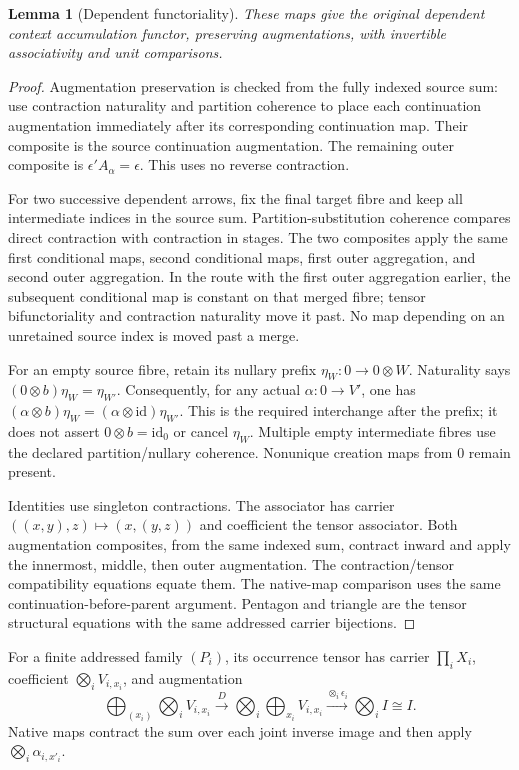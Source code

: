 \documentclass[11pt]{article}
\newtheorem{lemma}[theorem]{Lemma}
\newcommand{\id}{\mathrm{id}}
\begin{document}
\begin{lemma}[Dependent functoriality]
These maps give the original dependent context accumulation functor, preserving augmentations, with invertible associativity and unit comparisons.
\end{lemma}
\begin{proof}
Augmentation preservation is checked from the fully indexed source sum: use contraction naturality and partition coherence to place each continuation augmentation immediately after its corresponding continuation map. Their composite is the source continuation augmentation. The remaining outer composite is $\epsilon' A_\alpha=\epsilon$. This uses no reverse contraction.

For two successive dependent arrows, fix the final target fibre and keep all intermediate indices in the source sum. Partition-substitution coherence compares direct contraction with contraction in stages. The two composites apply the same first conditional maps, second conditional maps, first outer aggregation, and second outer aggregation. In the route with the first outer aggregation earlier, the subsequent conditional map is constant on that merged fibre; tensor bifunctoriality and contraction naturality move it past. No map depending on an unretained source index is moved past a merge.

For an empty source fibre, retain its nullary prefix $\eta_W:0\to0\otimes W$. Naturality says $(0\otimes b)\eta_W=\eta_{W'}$. Consequently, for any actual $\alpha:0\to V'$, one has $(\alpha\otimes b)\eta_W=(\alpha\otimes\id)\eta_{W'}$. This is the required interchange after the prefix; it does not assert $0\otimes b=\id_0$ or cancel $\eta_W$. Multiple empty intermediate fibres use the declared partition/nullary coherence. Nonunique creation maps from $0$ remain present.

Identities use singleton contractions. The associator has carrier $((x,y),z)\mapsto(x,(y,z))$ and coefficient the tensor associator. Both augmentation composites, from the same indexed sum, contract inward and apply the innermost, middle, then outer augmentation. The contraction/tensor compatibility equations equate them. The native-map comparison uses the same continuation-before-parent argument. Pentagon and triangle are the tensor structural equations with the same addressed carrier bijections.
\end{proof}

For a finite addressed family $(P_i)$, its occurrence tensor has carrier $\prod_i X_i$, coefficient $\bigotimes_iV_{i,x_i}$, and augmentation
\[
 \bigoplus_{(x_i)}\bigotimes_iV_{i,x_i}
 \xrightarrow D\bigotimes_i\bigoplus_{x_i}V_{i,x_i}
 \xrightarrow{\otimes_i\epsilon_i}\bigotimes_iI\cong I.
\]
Native maps contract the sum over each joint inverse image and then apply $\bigotimes_i\alpha_{i,x'_i}$.
\end{document}

